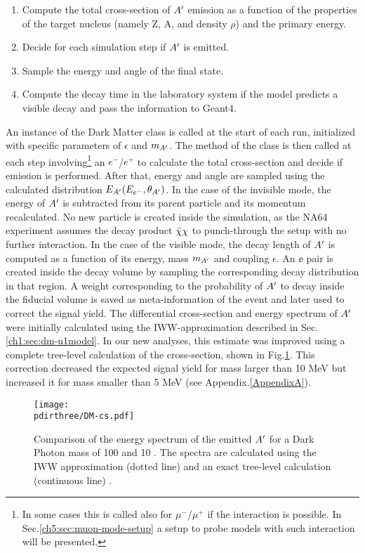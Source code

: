 \begin{enumerate}
\item Compute the total cross-section of $A'$ emission as a function of the properties of the target nucleus (namely Z, A, and density $\rho$) and the primary energy.
\item Decide for each simulation step if $A'$ is emitted.
\item Sample the energy and angle of the final state.
\item Compute the decay time in the laboratory system if the model predicts a visible decay and pass the information to Geant4.
\end{enumerate}

An instance of the Dark Matter class is called at the start of each run, initialized with specific parameters of $\epsilon$ and $m_{A'}$. The method of the class is then called at each step involving\footnote{In some cases this is called also for $\mu^-$/$\mu^+$ if the interaction is possible. In Sec.\ref{ch5:sec:muon-mode-setup} a setup to probe models with such interaction will be presented.} an $e^-$/$e^+$ to calculate the total cross-section and decide if emission is performed. After that, energy and angle are sampled using the calculated distribution $E_{A'}(E_{e^-}, \theta_{A'})$. In the case of the invisible mode, the energy of $A'$ is subtracted from its parent particle and its momentum recalculated. No new particle is created inside the simulation, as the NA64 experiment assumes the decay product $\bar{\chi} \chi$ to punch-through the setup with no further interaction. In the case of the visible mode, the decay length of $A'$ is computed as a function of its energy, mass $m_{A'}$ and coupling $\epsilon$. An $\ee$ pair is created inside the decay volume by sampling the corresponding decay distribution in that region. A weight corresponding to the probability of $A'$ to decay inside the fiducial volume is saved as meta-information of the event and later used to correct the signal yield.
The differential cross-section and energy spectrum of $A'$ were initially calculated using the IWW-approximation described in Sec.\ref{ch1:sec:dm-u1model}. In our new analyses, this estimate was improved using a complete tree-level calculation of the cross-section, shown in Fig.\ref{fig:dm-iww-tl}. This correction decreased the expected signal yield for mass larger than 10 MeV but increased it for mass smaller than 5 MeV \cite{DMsimulation} (see Appendix.\ref{AppendixA}).

\begin{figure}[htb!]
  \centering
  \texttt{[image: \\pdirthree/DM-cs.pdf]}
  \caption[IWW vs tree-level energy spectra]{Comparison of the energy spectrum of the emitted $A'$ for a Dark Photon mass of 100 \mev and 10 \mev. The spectra are calculated using the IWW approximation (dotted line) and an exact tree-level calculation (continuous line) \cite{DMsimulation}.}
  \label{fig:dm-iww-tl}
\end{figure}


